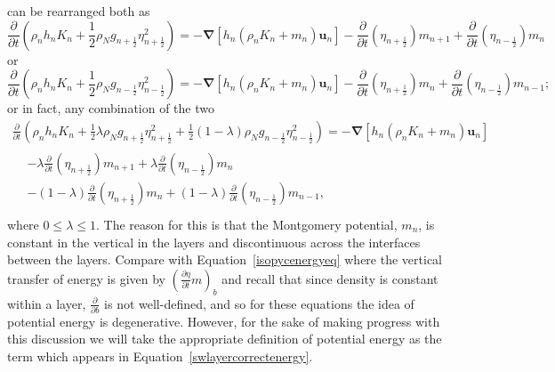\documentclass[12pt,a4paper]{report}
\newcommand*\equref[1]{Equation~\eqref{#1}}
\newcommand*{\half}{\frac{1}{2}}
\begin{document}
    can be rearranged both as
    \begin{equation}
    \frac{\partial}{\partial t}\left(\rho_{n} h_{n} K_{n}+ 
    \half \rho_{N} g_{n+\half }\eta_{n+\half }^{2} \right) 
    = -\boldsymbol{\nabla} \left[h_{n} \left(\rho_{n}K_{n}+m_{n}\right) \boldsymbol{u}_{n}\right] 
    - \frac{\partial}{\partial t}\left(\eta_{n+\half }\right)   m_{n+1}
    + \frac{\partial}{\partial t}\left(\eta_{n-\half }\right) m_{n}
    \label{swlayercorrectenergy}
    \end{equation}
    or
    \begin{equation}
    \frac{\partial}{\partial t}\left(\rho_{n}h_{n} K_{n}+ 
    \half \rho_{N} g_{n-\half }\eta_{n-\half }^{2} \right) 
    = -\boldsymbol{\nabla} \left[h_{n} \left(\rho_{n}K_{n}+m_{n}\right) \boldsymbol{u}_{n}\right] 
    - \frac{\partial}{\partial t}\left(\eta_{n+\half }\right)   m_{n}
    + \frac{\partial}{\partial t}\left(\eta_{n-\half }\right) m_{n-1};
    \end{equation}
    or in fact, any combination of the two
    \begin{equation}
    \begin{split}
    \frac{\partial}{\partial t}\left(\rho_{n}h_{n} K_{n}+ 
    \half \lambda\rho_{N} g_{n+\half }\eta_{n+\half }^{2}  +
    \half \left(1-\lambda\right)\rho_{N} g_{n-\half }\eta_{n-\half }^{2} \right) 
    = -\boldsymbol{\nabla} \left[h_{n} \left(\rho_{n}K_{n}+m_{n}\right) \boldsymbol{u}_{n}\right] \\
    \begin{split}
    &- \lambda\frac{\partial}{\partial t}\left(\eta_{n+\half }\right)   m_{n+1}
    + \lambda\frac{\partial}{\partial t}\left(\eta_{n-\half }\right) m_{n} \\
    &- \left(1-\lambda\right)\frac{\partial}{\partial t}\left(\eta_{n+\half }\right)   m_{n}
    + \left(1-\lambda\right)\frac{\partial}{\partial t}\left(\eta_{n-\half }\right) m_{n-1}, \\
    \end{split}
    \end{split}
    \end{equation}
    where $0 \leq \lambda \leq 1$. The reason for this is that the Montgomery potential,
    $m_{n}$, is constant in the vertical in the layers and discontinuous across the interfaces between the layers. Compare with \equref{isopycenergyeq} where the 
    vertical transfer of energy is given by 
    $\left(\frac{\partial \eta}{\partial t} m \right)_{b}$ and recall that since density is
     constant within a layer, $\frac{\partial }{\partial b}$ is not well-defined, and so for
      these equations the idea of potential energy is degenerative. However,
      for the sake of making progress with this discussion we will take the
      appropriate definition of potential energy as the term which appears in \equref{swlayercorrectenergy}.
    
\end{document}
